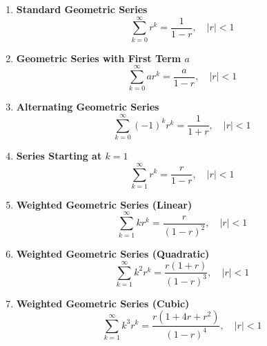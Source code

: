 \begin{enumerate}[leftmargin=*]
    \item \textbf{Standard Geometric Series}
        \[\sum_{k=0}^{\infty} r^k = \frac{1}{1 - r}, \quad |r| < 1\]
    
    \item \textbf{Geometric Series with First Term $a$}
        \[\sum_{k=0}^{\infty} a r^k = \frac{a}{1 - r}, \quad |r| < 1\]
    
    \item \textbf{Alternating Geometric Series}
        \[\sum_{k=0}^{\infty} (-1)^k r^k = \frac{1}{1 + r}, \quad |r| < 1\]
    
    \item \textbf{Series Starting at $k=1$}
        \[\sum_{k=1}^{\infty} r^k = \frac{r}{1 - r}, \quad |r| < 1\]
    
    \item \textbf{Weighted Geometric Series (Linear)}
        \[\sum_{k=1}^{\infty} k r^k = \frac{r}{(1 - r)^2}, \quad |r| < 1\]
    
    \item \textbf{Weighted Geometric Series (Quadratic)}
        \[\sum_{k=1}^{\infty} k^2 r^k = \frac{r(1 + r)}{(1 - r)^3}, \quad |r| < 1\]
    
    \item \textbf{Weighted Geometric Series (Cubic)}
        \[\sum_{k=1}^{\infty} k^3 r^k = \frac{r(1 + 4r + r^2)}{(1 - r)^4}, \quad |r| < 1\]
\end{enumerate}